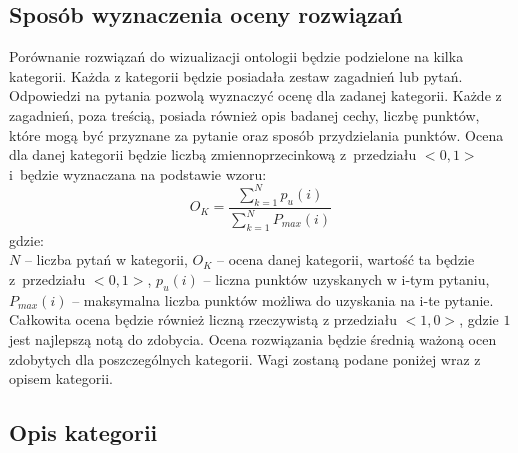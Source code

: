 \subsection*{Sposób wyznaczenia oceny rozwiązań}
Porównanie rozwiązań do wizualizacji ontologii będzie podzielone na kilka kategorii. Każda z kategorii będzie posiadała zestaw zagadnień lub pytań. 
Odpowiedzi na pytania pozwolą wyznaczyć ocenę dla zadanej kategorii. Każde z zagadnień, poza treścią, posiada również opis badanej cechy, liczbę 
punktów, które mogą być przyznane za pytanie oraz sposób przydzielania punktów. Ocena dla danej kategorii będzie liczbą zmiennoprzecinkową 
z~przedziału $ <0,1> $  i~będzie wyznaczana na podstawie wzoru:
\begin{equation}
   {O_{K}} =\frac{\sum_{k=1}^N  {p_{u}(i)}}{\sum_{k=1}^N  {P_{max}(i)}} 
\end{equation}
gdzie: \\
$ N $ -- liczba pytań w kategorii, \newline
$ O_{K} $ -- ocena danej kategorii, wartość ta będzie z~przedziału $ <0,1> $,\newline
$ p_{u}(i) $ -- liczna punktów uzyskanych w i-tym pytaniu, \\
$ P_{max}(i) $ -- maksymalna liczba punktów możliwa do uzyskania na i-te pytanie. \\


Całkowita ocena będzie również liczną rzeczywistą z przedziału $ <1,0> $, gdzie $1$ jest najlepszą notą do zdobycia. Ocena rozwiązania będzie średnią 
ważoną ocen zdobytych dla poszczególnych kategorii. Wagi zostaną podane poniżej wraz z opisem kategorii. 

\subsection*{Opis kategorii}

